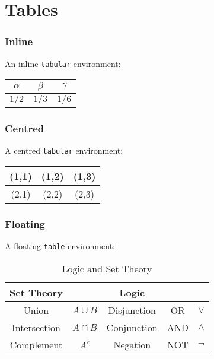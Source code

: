 
\chapter{Tables}

\subsection*{Inline}
An inline \texttt{tabular} environment:
\begin{tabular}{|ccc|}\hline
$\alpha$ & $\beta$ & $\gamma$ \\ \hline
$1/2$ & $1/3$ & $1/6$ \\ \hline
\end{tabular}

\subsection*{Centred}
A centred \texttt{tabular} environment:
\begin{center}
\begin{tabular}{|c|c|c|}
\hline
(1,1) & (1,2) & (1,3) \\
\hline
(2,1) & (2,2) & (2,3) \\
\hline
\end{tabular}
\end{center}

\subsection*{Floating}
A floating \texttt{table} environment:
\begin{table}[htb]
\centering
\begin{tabular}{|c|c||c|c|c|} \hline
Set Theory 		& 			& Logic			&		& \\ \hline
Union			& $A\cup B$	& Disjunction 	& OR 	& $\lor$	\\
Intersection		& $A\cap B$	& Conjunction	& AND 	& $\land$\\
Complement		& $A^c$		& Negation		& NOT 	& $\lnot$	\\ \hline
\end{tabular}
\caption{Logic and Set Theory}
\end{table}


